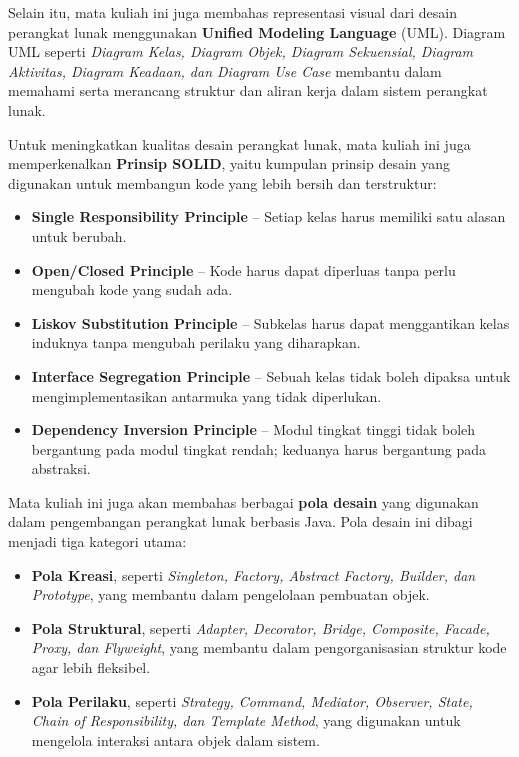 Selain itu, mata kuliah ini juga membahas representasi visual dari desain perangkat lunak menggunakan \textbf{Unified Modeling Language} (UML). Diagram UML seperti \textit{Diagram Kelas, Diagram Objek, Diagram Sekuensial, Diagram Aktivitas, Diagram Keadaan, dan Diagram Use Case} membantu dalam memahami serta merancang struktur dan aliran kerja dalam sistem perangkat lunak.

Untuk meningkatkan kualitas desain perangkat lunak, mata kuliah ini juga memperkenalkan \textbf{Prinsip SOLID}, yaitu kumpulan prinsip desain yang digunakan untuk membangun kode yang lebih bersih dan terstruktur:
\begin{itemize}
	\item \textbf{Single Responsibility Principle} – Setiap kelas harus memiliki satu alasan untuk berubah.
	\item \textbf{Open/Closed Principle} – Kode harus dapat diperluas tanpa perlu mengubah kode yang sudah ada.
	\item \textbf{Liskov Substitution Principle} – Subkelas harus dapat menggantikan kelas induknya tanpa mengubah perilaku yang diharapkan.
	\item \textbf{Interface Segregation Principle} – Sebuah kelas tidak boleh dipaksa untuk mengimplementasikan antarmuka yang tidak diperlukan.
	\item \textbf{Dependency Inversion Principle} – Modul tingkat tinggi tidak boleh bergantung pada modul tingkat rendah; keduanya harus bergantung pada abstraksi.
\end{itemize}

Mata kuliah ini juga akan membahas berbagai \textbf{pola desain} yang digunakan dalam pengembangan perangkat lunak berbasis Java. Pola desain ini dibagi menjadi tiga kategori utama:
\begin{itemize}
	\item \textbf{Pola Kreasi}, seperti \textit{Singleton, Factory, Abstract Factory, Builder, dan Prototype}, yang membantu dalam pengelolaan pembuatan objek.
	\item \textbf{Pola Struktural}, seperti \textit{Adapter, Decorator, Bridge, Composite, Facade, Proxy, dan Flyweight}, yang membantu dalam pengorganisasian struktur kode agar lebih fleksibel.
	\item \textbf{Pola Perilaku}, seperti \textit{Strategy, Command, Mediator, Observer, State, Chain of Responsibility, dan Template Method}, yang digunakan untuk mengelola interaksi antara objek dalam sistem.
\end{itemize}

